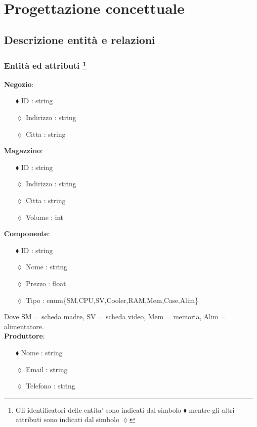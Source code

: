 \section{Progettazione concettuale}

\subsection{Descrizione entità e relazioni} 
\subsubsection[Entità ed attributi]{Entità ed attributi \protect\footnote{Gli identificatori delle entita' sono indicati dal simbolo $\blacklozenge$ mentre gli altri attributi sono indicati dal simbolo $\lozenge$}}



\textbf{Negozio}: 
\begin{itemize}
\item [ $\blacklozenge$]ID : string
\item [$\lozenge$]Indirizzo : string 
\item[$\lozenge$]Citta : string
\end{itemize}

\textbf{Magazzino}:
\begin{itemize}[noitemsep]
\item [$\blacklozenge$] ID : string
\item [$\lozenge$] Indirizzo : string
\item [$\lozenge$] Citta : string
\item [$\lozenge$] Volume : int
\end{itemize}

\textbf{Componente}:
\begin{itemize}
\item [$\blacklozenge$] ID : string
\item [$\lozenge$] Nome : string
\item [$\lozenge$] Prezzo : float
\item [$\lozenge$] Tipo : enum\{SM,CPU,SV,Cooler,RAM,Mem,Case,Alim\}
\end{itemize}
Dove SM = scheda madre, SV = scheda video, Mem = memoria, Alim = alimentatore.\\

\textbf{Produttore}:
\begin{itemize}
\item [$\blacklozenge$] Nome : string
\item [$\lozenge$] Email : string
\item [$\lozenge$] Telefono : string
\end{itemize}

